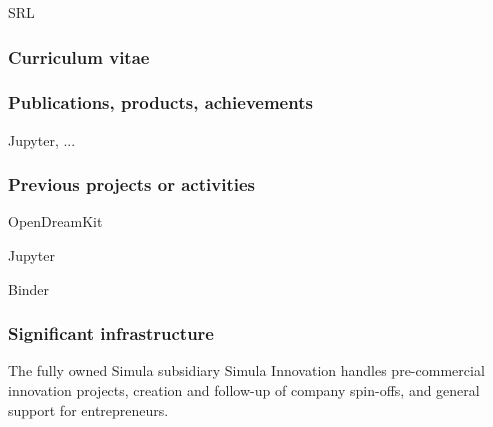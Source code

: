 \begin{sitedescription}{SRL}
\subsubsection*{Curriculum vitae}


% 
% 
% 

\subsubsection*{Publications, products, achievements}

\begin{compactenum}
\item Jupyter, ...
\end{compactenum}

\subsubsection*{Previous projects or activities}

\begin{compactenum}
\item OpenDreamKit
\item Jupyter
\item Binder
\end{compactenum}

\subsubsection*{Significant infrastructure}

The fully owned Simula subsidiary Simula Innovation handles pre-commercial innovation projects, creation and follow-up of company spin-offs, and general support for entrepreneurs.
\end{sitedescription}






